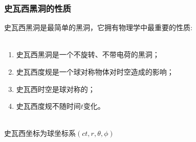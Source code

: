 \documentclass{beamer}
\begin{document}
\begin{frame}
    \frametitle{史瓦西黑洞的性质}
    史瓦西黑洞是最简单的黑洞，它拥有物理学中最重要的性质:
    \\~\\
    \begin{enumerate}
        \item 史瓦西黑洞是一个不旋转、不带电荷的黑洞；
        \item 史瓦西度规是一个球对称物体对时空造成的影响；
        \item 史瓦西时空是球对称的；
        \item 史瓦西度规不随时间$t$变化。
    \end{enumerate}
    ~\\
   史瓦西坐标为球坐标系$\left(ct,r,\theta,\phi\right)$
\end{frame}
\end{document}

